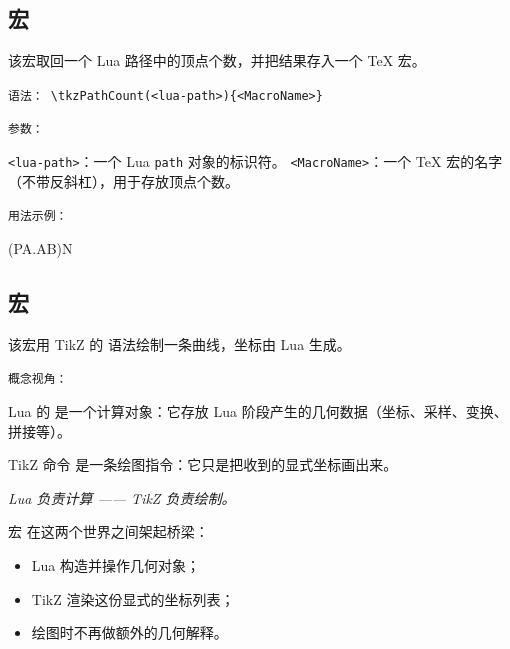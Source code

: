 \subsection{宏 }
该宏取回一个 Lua 路径中的顶点个数，并把结果存入一个 TeX 宏。

\texttt{语法： }\verb|\tkzPathCount(<lua-path>){<MacroName>}|

\texttt{参数： }

\verb|<lua-path>|：一个 Lua \verb|path| 对象的标识符。
\verb|<MacroName>|：一个 TeX 宏的名字（不带反斜杠），用于存放顶点个数。


\texttt{用法示例： }

\begin{tkzexample}[latex=.5\textwidth]
\tkzPathCount(PA.AB){N}
\begin{center}
\end{center}
\end{tkzexample}



\subsection{宏 }
该宏用 TikZ 的  语法绘制一条曲线，坐标由 Lua 生成。

\medskip
\texttt{概念视角：}

Lua 的  是一个计算对象：它存放 Lua 阶段产生的几何数据（坐标、采样、变换、拼接等）。

TikZ 命令  是一条绘图指令：它只是把收到的显式坐标画出来。

\medskip
\emph{Lua 负责计算 —— TikZ 负责绘制。}

\medskip
宏  在这两个世界之间架起桥梁：

\begin{itemize}
\item Lua 构造并操作几何对象；
\item TikZ 渲染这份显式的坐标列表；
\item 绘图时不再做额外的几何解释。
\end{itemize}

